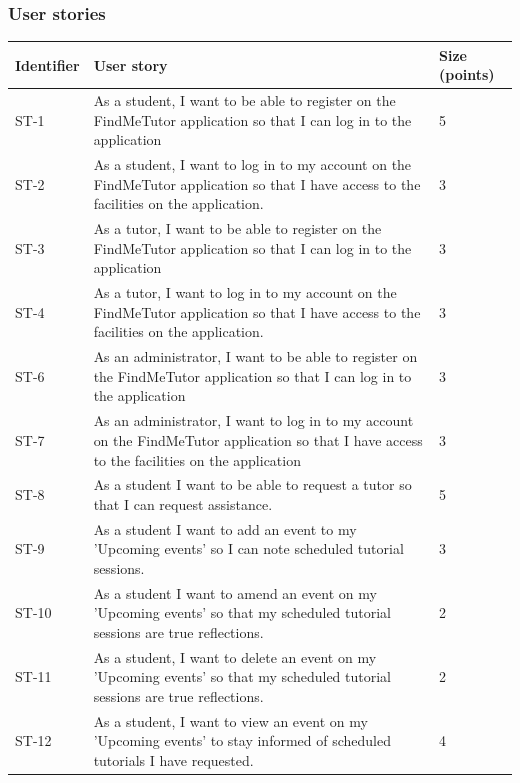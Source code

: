 \documentclass[12pt]{article}
\begin{document}
{\newpage
\subsubsection{User stories}
{

\begin{longtable}{| l | p{10cm}| l |}
			\hline
			\textbf{Identifier} & \textbf{User story} & \textbf{Size (points)}

						\\ \hline ST-1 & As a student, I want to be able to register on the FindMeTutor application so that I can log in to the application  & 5
			\\ \hline ST-2 & As a student, I want to  log in to my account on the FindMeTutor application so that I have access to the facilities on the application.  & 3
			\\ \hline ST-3 & As a tutor, I want to be able to register on the FindMeTutor application so that I can log in to the application  & 3
																\\ \hline ST-4 & As a tutor, I want to  log in to my account on the FindMeTutor application so that I have access to the facilities on the application.  & 3
																\\ \hline ST-6 & As an administrator, I want to be able to register on the FindMeTutor application so that I can log in to the application  & 3
													\\ \hline ST-7 & As an administrator, I want to  log in to my account on the FindMeTutor application so that I have access to the facilities on the application  &3

			\\ \hline ST-8 & As a student I want to be able to request a tutor so that I can request assistance.& 5
			\\ \hline ST-9 & As a student I want to add an event to my 'Upcoming events' so I can note scheduled tutorial sessions. &3

			\\ \hline ST-10 & As a student I want to amend an event on my 'Upcoming events' so that my scheduled tutorial sessions are true reflections. & 2

			\\ \hline ST-11 & As a student, I want to delete an event on my 'Upcoming events' so that my scheduled tutorial sessions are true reflections. & 2

			\\ \hline ST-12 & As a student, I want to  view an event on my 'Upcoming events' to stay informed of scheduled tutorials I have requested. & 4


\end{longtable}}}
\end{document}
